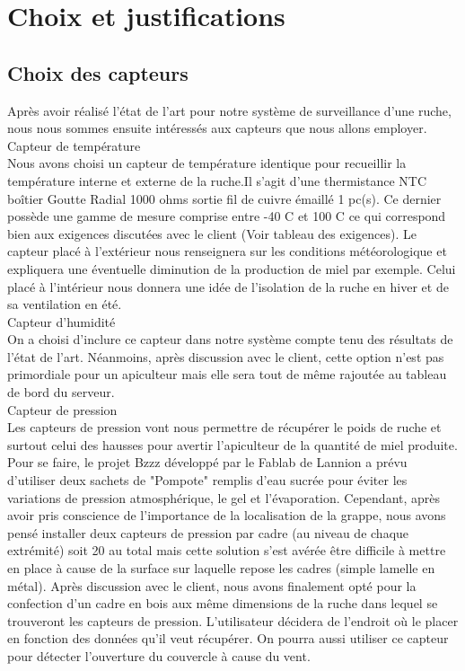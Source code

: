 ﻿

\chapter{Choix et justifications}

\section{Choix des capteurs}
\vspace{1.5cm}
Après avoir réalisé l'état de l'art pour notre système de surveillance d'une ruche, nous nous sommes ensuite intéressés aux capteurs que nous allons employer.\\

Capteur de température\\

Nous avons choisi un capteur de température identique pour recueillir la température interne et externe de la ruche.Il s'agit d'une thermistance NTC boîtier Goutte Radial 1000 ohms sortie fil de cuivre émaillé 1 pc(s). Ce dernier possède une gamme de mesure comprise entre -40 C et 100 C ce qui correspond bien aux exigences discutées avec le client (Voir tableau des exigences). Le capteur placé à l'extérieur nous renseignera sur les conditions météorologique et expliquera une éventuelle diminution de la production de miel par exemple. Celui placé à l'intérieur nous donnera une idée de l'isolation de la ruche en hiver et de sa ventilation en été.\\  

Capteur d'humidité\\

On a choisi d'inclure ce capteur dans notre système compte tenu des résultats de l'état de l'art. Néanmoins, après discussion avec le client, cette option n'est pas primordiale pour un apiculteur mais elle sera tout de même rajoutée au tableau de bord du serveur.\\

Capteur de pression\\

Les capteurs de pression vont nous permettre de récupérer le poids de ruche et surtout celui des hausses pour avertir l'apiculteur de la quantité de miel produite. Pour se faire, le projet Bzzz développé par le Fablab de Lannion a prévu d'utiliser deux sachets de "Pompote" remplis d'eau sucrée pour éviter les variations de pression atmosphérique, le gel et l'évaporation. Cependant, après avoir pris conscience de l'importance de la localisation de la grappe, nous avons pensé installer deux capteurs de pression par cadre (au niveau de chaque extrémité) soit 20 au total mais cette solution s'est avérée être difficile à mettre en place à cause de la surface sur laquelle repose les cadres (simple lamelle en métal). Après discussion avec le client, nous avons finalement opté pour la confection d'un cadre en bois aux même dimensions de la ruche dans lequel se trouveront les capteurs de pression. L'utilisateur décidera de l'endroit où le placer en fonction des données qu'il veut récupérer. On pourra aussi utiliser ce capteur pour détecter l'ouverture du couvercle à cause du vent.\\

